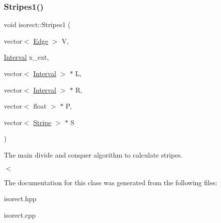 \subsubsection{\texorpdfstring{Stripes1()}{Stripes1()}}
{\footnotesize\ttfamily void isorect\+::\+Stripes1 (\begin{DoxyParamCaption}\item[{vector$<$ \hyperlink{classEdge}{Edge} $>$}]{V,  }\item[{\hyperlink{classInterval}{Interval}}]{x\+\_\+ext,  }\item[{vector$<$ \hyperlink{classInterval}{Interval} $>$ $\ast$}]{L,  }\item[{vector$<$ \hyperlink{classInterval}{Interval} $>$ $\ast$}]{R,  }\item[{vector$<$ float $>$ $\ast$}]{P,  }\item[{vector$<$ \hyperlink{classStripe}{Stripe} $>$ $\ast$}]{S }\end{DoxyParamCaption})}



The main divide and conquer algorithm to calculate stripes. 

$<$ 

The documentation for this class was generated from the following files\+:\begin{DoxyCompactItemize}
\item 
isorect.\+hpp\item 
isorect.\+cpp\end{DoxyCompactItemize}
